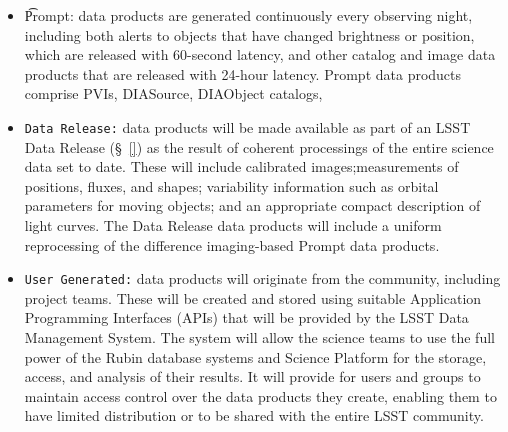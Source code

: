 \begin{itemize}
\item {\t Prompt:} data products are generated continuously every observing night, 
including both alerts to objects that have changed brightness or position, 
which are released with 60-second latency, 
and other catalog and image data products that are released with 24-hour latency. 
Prompt  data products comprise PVIs,  DIASource, DIAObject catalogs, 
\item {\tt Data Release:} data products will be made available as part of an LSST Data Release (\S~\ref{}) as the result of coherent
processings of the entire science data set to date. 
These will include calibrated images;measurements of positions, fluxes, and shapes; variability information such as orbital
parameters for moving objects; and an appropriate compact description of light curves.
The Data Release data products will include a uniform reprocessing of the difference
imaging-based Prompt data products.
\item {\tt User Generated:} data products will originate from the community, including project teams. 
These will be created and stored using suitable Application Programming Interfaces (APIs) 
that will be provided by the LSST Data Management System. 
The system will allow the science teams to use the full power of the Rubin database systems and
Science Platform for the storage, access, and analysis of their results. 
It will provide for users and groups to maintain access control over the data products they create, 
enabling them to have limited distribution or to be shared with the entire LSST community. 
\end{itemize}


%



